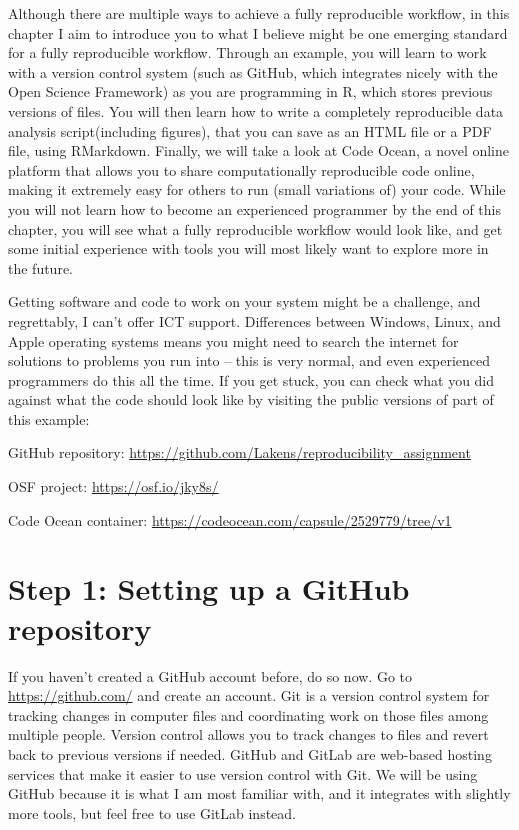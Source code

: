 \documentclass[
  oneside]{krantz}
\begin{document}
Although there are multiple ways to achieve a fully reproducible workflow, in
this chapter I aim to introduce you to what I believe might be one emerging
standard for a fully reproducible workflow. Through an example, you will learn
to work with a version control system (such as GitHub, which integrates nicely
with the Open Science Framework) as you are programming in R,
which stores previous versions of files. You will then learn how to write a
completely reproducible data analysis script(including figures),
that you can save as an HTML file or a PDF file, using RMarkdown.
Finally, we will take a look at Code Ocean, a novel online platform
that allows you to share computationally reproducible code online, making it
extremely easy for others to run (small variations of) your code. While you will not
learn how to become an experienced programmer by the end of this chapter, you will
see what a fully reproducible workflow would look like, and get some initial
experience with tools you will most likely want to explore more in the future.

Getting software and code to work on your system might be a challenge, and
regrettably, I can't offer ICT support. Differences between Windows, Linux, and
Apple operating systems means you might need to search the internet for
solutions to problems you run into -- this is very normal, and even experienced
programmers do this all the time. If you get stuck, you can check what you did
against what the code should look like by visiting the public versions of
part of this example:

GitHub repository: \url{https://github.com/Lakens/reproducibility_assignment}

OSF project: \url{https://osf.io/jky8s/}

Code Ocean container: \url{https://codeocean.com/capsule/2529779/tree/v1}

\hypertarget{step-1-setting-up-a-github-repository}{%
\section{Step 1: Setting up a GitHub repository}\label{step-1-setting-up-a-github-repository}}

If you haven't created a GitHub account before, do so now. Go to
\url{https://github.com/} and create an account. Git is a version control system for
tracking changes in computer files and coordinating work on those files among
multiple people. Version control allows you to track changes to files and revert
back to previous versions if needed. GitHub and GitLab are web-based hosting
services that make it easier to use version control with Git. We will be using
GitHub because it is what I am most familiar with, and it integrates with
slightly more tools, but feel free to use GitLab instead.
\end{document}

